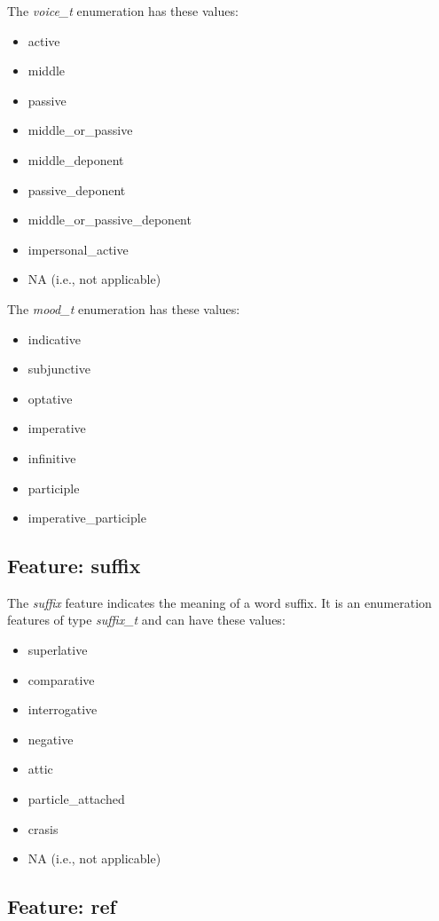 \documentclass[11pt,oneside,a4paper]{memoir}
\begin{document}
The \emph{voice\_t} enumeration has these values:

\begin{itemize}
\item active
\item middle
\item passive
\item middle\_or\_passive
\item middle\_deponent
\item passive\_deponent
\item middle\_or\_passive\_deponent
\item impersonal\_active
\item NA (i.e., not applicable)
\end{itemize}

The \emph{mood\_t} enumeration has these values:

\begin{itemize}
\item indicative
\item subjunctive
\item optative
\item imperative
\item infinitive
\item participle
\item imperative\_participle
\end{itemize}


\subsection{Feature: suffix}

The \emph{suffix} feature indicates the meaning of a word suffix. It is an enumeration features of
type \emph{suffix\_t} and can have these values:

\begin{itemize}
\item superlative
\item comparative
\item interrogative
\item negative
\item attic
\item particle\_attached
\item crasis
\item NA (i.e., not applicable)
\end{itemize}

\subsection{Feature: ref}
\end{document}
